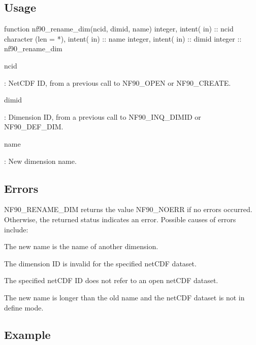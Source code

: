 \subsection*{Usage}


\begin{DoxyCode}
\textcolor{keyword}{function }nf90\_rename\_dim(ncid, dimid, name)
  \textcolor{keywordtype}{integer},             \textcolor{keywordtype}{intent( in)} :: ncid
  \textcolor{keywordtype}{character (len = *)}, \textcolor{keywordtype}{intent( in)} :: name
  \textcolor{keywordtype}{integer},             \textcolor{keywordtype}{intent( in)} :: dimid
  \textcolor{keywordtype}{integer}                          :: nf90\_rename\_dim
\end{DoxyCode}


{\ttfamily ncid}

\+: Net\+C\+DF ID, from a previous call to N\+F90\+\_\+\+O\+P\+EN or N\+F90\+\_\+\+C\+R\+E\+A\+TE.

{\ttfamily dimid}

\+: Dimension ID, from a previous call to N\+F90\+\_\+\+I\+N\+Q\+\_\+\+D\+I\+M\+ID or N\+F90\+\_\+\+D\+E\+F\+\_\+\+D\+IM.

{\ttfamily name}

\+: New dimension name.

\subsection*{Errors}

N\+F90\+\_\+\+R\+E\+N\+A\+M\+E\+\_\+\+D\+IM returns the value N\+F90\+\_\+\+N\+O\+E\+RR if no errors occurred. Otherwise, the returned status indicates an error. Possible causes of errors include\+:


\begin{DoxyItemize}
\item The new name is the name of another dimension.
\item The dimension ID is invalid for the specified net\+C\+DF dataset.
\item The specified net\+C\+DF ID does not refer to an open net\+C\+DF dataset.
\item The new name is longer than the old name and the net\+C\+DF dataset is not in define mode.
\end{DoxyItemize}

\subsection*{Example}

